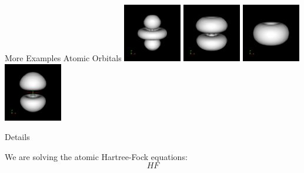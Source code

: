 \documentclass{beamer}
\begin{document}
\begin{frame}{More Examples Atomic Orbitals}
\includegraphics[width=1in]{../img/orbital_n5l2m0.png}
\includegraphics[width=1in]{../img/orbital_n5l2m1.png}
\includegraphics[width=1in]{../img/orbital_n5l2m2.png}
\includegraphics[width=1in]{../img/orbital_n6l1m0.png}


\end{frame}

\begin{frame}{Details}

We are solving the atomic Hartree-Fock equations:
\[
    HF
\]

\end{frame}
\end{document}
